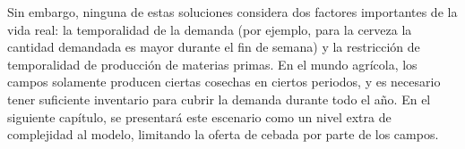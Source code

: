Sin embargo, ninguna de estas soluciones considera dos factores importantes de la vida real: la temporalidad de la demanda (por ejemplo, para la cerveza la cantidad demandada es mayor durante el fin de semana) y la restricción de temporalidad de producci\'on de materias primas. En el mundo agr\'icola, los campos solamente producen ciertas cosechas en ciertos periodos, y es necesario tener suficiente inventario para cubrir la demanda durante todo el a\~no. En el siguiente cap\'itulo, se presentar\'a este escenario como un nivel extra de complejidad al modelo, limitando la oferta de cebada por parte de los campos.